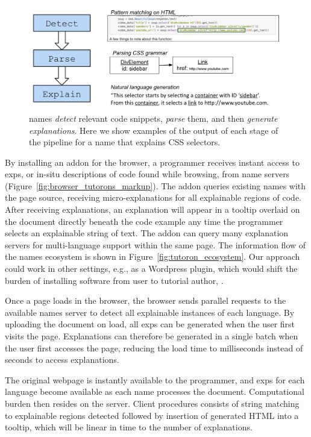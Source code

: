 \begin{figure}
\centering
    \includegraphics[width=\columnwidth]{figures/explanation_pipeline}
    \caption{\Glspl{name} \emph{detect} relevant code snippets, \emph{parse} them, and then \emph{generate explanations}.  Here we show examples of the output of each stage of the pipeline for a \gls{name} that explains CSS selectors.}\label{fig:explanation_pipeline}
\end{figure}
\fi

By installing an addon for the browser, a programmer receives instant access to \glspl{exp}, or in-situ descriptions of code found while browsing, from \gls{name} servers (Figure~\ref{fig:browser_tutorons_markup}).
The addon queries existing \glspl{name} with the page source, receiving micro-explanations for all explainable regions of code.
After receiving explanations, an explanation will appear in a tooltip overlaid on the document directly beneath the code example any time the programmer selects an explainable string of text.
The addon can query many explanation servers for multi-language support within the same page.
The information flow of the \Glspl{name} ecosystem is shown in Figure~\ref{fig:tutoron_ecosystem}.
Our approach could work in other settings, e.g., as a Wordpress plugin, which would shift the burden of installing software from user to tutorial author, .

\begin{changes}
Once a page loads in the browser, the browser sends parallel requests to the available \glspl{name} server to detect all explainable instances of each language.
By uploading the document on load, all \glspl{exp} can be generated when the user first visits the page.
Explanations can therefore be generated in a single batch when the user first accesses the page, reducing the load time to milliseconds instead of seconds to access explanations.
\end{changes}
The original webpage is instantly available to the programmer, and \glspl{exp} for each language become available as each \gls{name} processes the document.
Computational burden then resides on the server.
 Client procedures consists of string matching to explainable regions detected followed by insertion of generated HTML into a tooltip, which will be linear in time to the number of explanations.\fi

